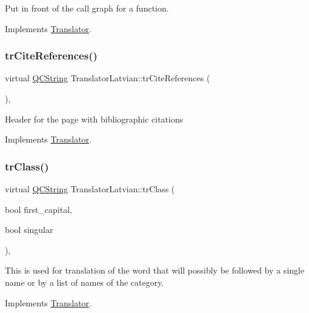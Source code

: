 Put in front of the call graph for a function. 

Implements \mbox{\hyperlink{class_translator}{Translator}}.

\mbox{\label{class_translator_latvian_abe5515ffd2d28049cf44714cdf88645d}} 
\subsubsection{\texorpdfstring{trCiteReferences()}{trCiteReferences()}}
{\footnotesize\ttfamily virtual \mbox{\hyperlink{class_q_c_string}{Q\+C\+String}} Translator\+Latvian\+::tr\+Cite\+References (\begin{DoxyParamCaption}{ }\end{DoxyParamCaption})\hspace{0.3cm}{\ttfamily [inline]}, {\ttfamily [virtual]}}

Header for the page with bibliographic citations 

Implements \mbox{\hyperlink{class_translator}{Translator}}.

\mbox{\label{class_translator_latvian_aab8dd49a826bce1e1a22f2d1ef61e4ed}} 
\subsubsection{\texorpdfstring{trClass()}{trClass()}}
{\footnotesize\ttfamily virtual \mbox{\hyperlink{class_q_c_string}{Q\+C\+String}} Translator\+Latvian\+::tr\+Class (\begin{DoxyParamCaption}\item[{bool}]{first\+\_\+capital,  }\item[{bool}]{singular }\end{DoxyParamCaption})\hspace{0.3cm}{\ttfamily [inline]}, {\ttfamily [virtual]}}

This is used for translation of the word that will possibly be followed by a single name or by a list of names of the category. 

Implements \mbox{\hyperlink{class_translator}{Translator}}.

